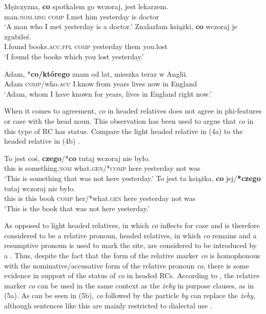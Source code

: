 \documentclass[output=paper]{langsci/langscibook}
\begin{document}
\ea%
    \label{ex:leska:2}
    \ea
    \gll Mężczyzna, \textbf{co} spotkałem go wczoraj, jest lekarzem.\\
         man.\textsc{nom.msg} \textsc{comp} I.met him yesterday is doctor\\
    \glt ‘A man who I met yesterday is a doctor.’
    \ex
    \gll Znalazłam   książki, \textbf{co} wczoraj   je zgubiłeś. \\
         I.found books.\textsc{acc.fpl} \textsc{comp}\textsubscript{} yesterday them you.lost\\
    \glt ‘I found the books which you lost yesterday.’
    \z
\z    

\ea%
    \label{ex:leska:3}
    \gll Adam, *\textbf{co/którego} znam od lat, mieszka teraz w Anglii.    \\
         Adam \textsc{comp}/who\textsc{.acc} I.know from years lives now in England\\
    \glt ‘Adam, whom I have known for years, lives in England right now.’
    \z


When it comes to agreement, \textit{co} in headed relatives does not agree in phi-features or case with the head noun. This observation has been used to argue that \textit{co} in this type of RC has  status. Compare the light headed relative in (4a) to the headed relative in (4b) \citep{Citko2004}.

\ea%
    \label{ex:leska:4}
    \ea
    \gll To   jest   coś,   \textbf{czego}/*\textbf{co}   tutaj  wczoraj    nie   było.   \\
         this   is   something.\textsc{nom}   what.\textsc{gen}/*\textsc{comp}  here  yesterday  not   was\\
    \glt ‘This is something that was not here yesterday.’
    \ex
    \gll To   jest   ta   książka,   \textbf{co}   jej/\textbf{*czego}   tutaj  wczoraj   nie  było.        \\
         this   is   this   book   \textsc{comp}   her/*what.\textsc{gen}   here   yesterday  not  was\\
    \glt ‘This is the book that was not here yesterday.’
    \z
\z

As opposed to light headed relatives, in which \textit{co} inflects for case and is therefore considered to be a relative pronoun, headed relatives, in which \textit{co} remains  and a resumptive pronoun is used to mark the  site, are considered to be introduced by a . Thus, despite the fact that the form of the  relative marker \textit{co} is homophonous with the nominative\slash accusative form of the relative pronoun \textit{co}, there is some evidence in support of the  status of \textit{co} in headed RCs. According to \citet{Bondaruk1995}, the relative marker \textit{co} can be used in the same context as the  \textit{żeby} in purpose clauses, as in (5a). As can be seen in (5b), \textit{co} followed by the particle \textit{by} can replace the  \textit{żeby}, although sentences like this are mainly restricted to dialectal use \citep[35]{Bondaruk1995}.
\end{document}
